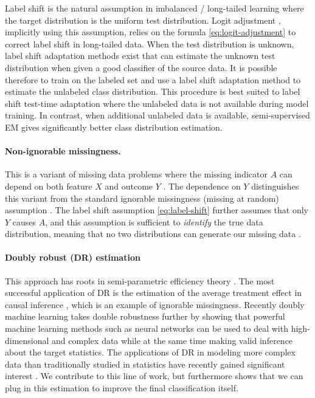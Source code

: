 Label shift is the natural assumption in imbalanced / long-tailed learning where the target distribution is the uniform test distribution. Logit adjustment \cite{logitadjustment}, implicitly using this assumption, relies on the formula \cref{eq:logit-adjustment} to correct label shift in long-tailed data. When the test distribution is unknown, label shift adaptation methods exist that can estimate the unknown test distribution \cite{mlls, mllsishardtobeat, bbse, rlls} when given a good classifier of the source data. It is possible therefore to train on the labeled set and use a label shift adaptation method to estimate the unlabeled class distribution. This procedure is best suited to label shift test-time adaptation \cite{ttsla, minh-gpa} where the unlabeled data is not available during model training. In contrast, when additional unlabeled data is available, semi-supervised EM gives significantly better class distribution estimation.

\paragraph{Non-ignorable missingness.} This is a variant of missing data problems where the missing indicator $A$ can depend on both feature $X$ and outcome $Y$ \cite{rubin-missingdata}. 
The dependence on $Y$ distinguishes this variant from the standard ignorable missingness (missing at random) assumption \cite{tsiatis-missingdata}. The label shift assumption \cref{eq:label-shift} further assumes that only $Y$ causes $A$, and this assumption is sufficient to \textit{identify} the true data distribution, meaning that no two distributions can generate our missing data \cite{labelshift-nonignorable, arelabelsinformative}.


\paragraph{Doubly robust (DR) estimation} 
\label{subsec:related-work-dr}
This approach has roots in semi-parametric efficiency theory \cite{kennedy-dr, dml}. The most successful application of DR is the estimation of the average treatment effect in causal inference \cite{tsiatis-missingdata, pham2023stable}, which is an example of ignorable missingness. Recently doubly machine learning \cite{dml, riesznet} takes double robustness further by showing that powerful machine learning methods such as neural networks can be used to deal with high-dimensional and complex data while at the same time making valid inference about the target statistics. The applications of DR in modeling more complex data than traditionally studied in statistics have recently gained significant interest \cite{dragonnet, riesznet, zhang2023towards}. We contribute to this line of work, but furthermore shows that we can plug in this estimation to improve the final classification itself.

